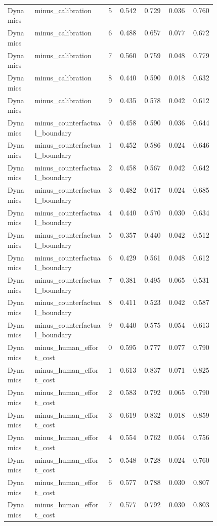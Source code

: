 \documentclass{article}
\begin{document}
\begin{center}
\begin{longtable}{p{0.13\linewidth}p{0.35\linewidth}rrrrr}
Dynamics & minus\_calibration & 5 & 0.542 & 0.729 & 0.036 & 0.760\\
Dynamics & minus\_calibration & 6 & 0.488 & 0.657 & 0.077 & 0.672\\
Dynamics & minus\_calibration & 7 & 0.560 & 0.759 & 0.048 & 0.779\\
Dynamics & minus\_calibration & 8 & 0.440 & 0.590 & 0.018 & 0.632\\
Dynamics & minus\_calibration & 9 & 0.435 & 0.578 & 0.042 & 0.612\\
Dynamics & minus\_counterfactual\_boundary & 0 & 0.458 & 0.590 & 0.036 & 0.644\\
Dynamics & minus\_counterfactual\_boundary & 1 & 0.452 & 0.586 & 0.024 & 0.646\\
Dynamics & minus\_counterfactual\_boundary & 2 & 0.458 & 0.567 & 0.042 & 0.642\\
Dynamics & minus\_counterfactual\_boundary & 3 & 0.482 & 0.617 & 0.024 & 0.685\\
Dynamics & minus\_counterfactual\_boundary & 4 & 0.440 & 0.570 & 0.030 & 0.634\\
Dynamics & minus\_counterfactual\_boundary & 5 & 0.357 & 0.440 & 0.042 & 0.512\\
Dynamics & minus\_counterfactual\_boundary & 6 & 0.429 & 0.561 & 0.048 & 0.612\\
Dynamics & minus\_counterfactual\_boundary & 7 & 0.381 & 0.495 & 0.065 & 0.531\\
Dynamics & minus\_counterfactual\_boundary & 8 & 0.411 & 0.523 & 0.042 & 0.587\\
Dynamics & minus\_counterfactual\_boundary & 9 & 0.440 & 0.575 & 0.054 & 0.613\\
Dynamics & minus\_human\_effort\_cost & 0 & 0.595 & 0.777 & 0.077 & 0.790\\
Dynamics & minus\_human\_effort\_cost & 1 & 0.613 & 0.837 & 0.071 & 0.825\\
Dynamics & minus\_human\_effort\_cost & 2 & 0.583 & 0.792 & 0.065 & 0.790\\
Dynamics & minus\_human\_effort\_cost & 3 & 0.619 & 0.832 & 0.018 & 0.859\\
Dynamics & minus\_human\_effort\_cost & 4 & 0.554 & 0.762 & 0.054 & 0.756\\
Dynamics & minus\_human\_effort\_cost & 5 & 0.548 & 0.728 & 0.024 & 0.760\\
Dynamics & minus\_human\_effort\_cost & 6 & 0.577 & 0.788 & 0.030 & 0.807\\
Dynamics & minus\_human\_effort\_cost & 7 & 0.577 & 0.792 & 0.030 & 0.803\\

\end{longtable}
\end{center}
\end{document}
